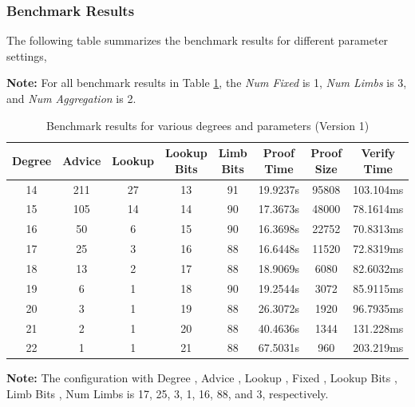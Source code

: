 \documentclass{article}
\begin{document}
\subsubsection{Benchmark Results}
The following table summarizes the benchmark results for different parameter settings, 

\textbf{Note:} For all benchmark results in Table \ref{tab:version1}, the \textit{Num Fixed} is 1, \textit{Num Limbs} is 3, and \textit{Num Aggregation} is 2.
\begin{table}[h]
    \centering
    \begin{tabular}{c|c|c|c|c|c|c|c} \hline
        Degree & Advice & Lookup & Lookup Bits & Limb Bits & Proof Time & Proof Size & Verify Time \\ \hline
        14 & 211 & 27 & 13 & 91 & 19.9237s & 95808 & 103.104ms \\ \hline
        15 & 105 & 14 & 14 & 90 & 17.3673s & 48000 & 78.1614ms \\ \hline
        16 & 50 & 6 & 15 & 90 & 16.3698s & 22752 & 70.8313ms \\ \hline
        17 & 25 & 3 & 16 & 88 & 16.6448s & 11520 & 72.8319ms \\ \hline
        18 & 13 & 2 & 17 & 88 & 18.9069s & 6080 & 82.6032ms \\ \hline
        19 & 6 & 1 & 18 & 90 & 19.2544s & 3072 & 85.9115ms \\ \hline
        20 & 3 & 1 & 19 & 88 & 26.3072s & 1920 & 96.7935ms \\ \hline
        21 & 2 & 1 & 20 & 88 & 40.4636s & 1344 & 131.228ms \\ \hline
        22 & 1 & 1 & 21 & 88 & 67.5031s & 960 & 203.219ms \\ \hline
    \end{tabular}
    \caption{Benchmark results for various degrees and parameters (Version 1)}
    \label{tab:version1}
\end{table}

\textbf{Note:} The configuration with Degree , Advice , Lookup , Fixed , Lookup Bits , Limb Bits , Num Limbs is 17, 25, 3, 1, 16, 88, and 3, respectively.
\end{document}
